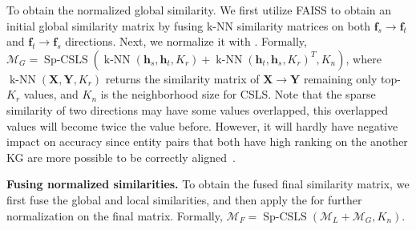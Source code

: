To obtain the normalized global similarity. We first utilize FAISS to obtain an initial global similarity matrix by fusing k-NN similarity matrices on both $\mathbf{f}_s \rightarrow \mathbf{f}_t$ and $\mathbf{f}_t \rightarrow \mathbf{f}_s$ directions. Next, we normalize it with \SparseCSLS{}. Formally, $\mathcal{M}_{G} = \operatorname{Sp-CSLS}(\operatorname{k-NN}(\mathbf{h}_s, \mathbf{h}_t,K_r) + \operatorname{k-NN}(\mathbf{h}_t, \mathbf{h}_s,K_r)^T, K_n)$, where $\operatorname{k-NN}(\mathbf{X}, \mathbf{Y},K_r)$ returns the similarity matrix of $\mathbf{X} \rightarrow \mathbf{Y}$ remaining only top-$K_r$ values, and $K_n$ is the neighborhood size for CSLS. Note that the sparse similarity of two directions may have some values overlapped, this overlapped values will become twice the value before. However, it will hardly have negative impact on accuracy since entity pairs that both have high ranking on the another KG are more possible to be correctly aligned~\cite{MRAEA20}.

\noindent
\textbf{Fusing normalized similarities.}
To obtain the fused final similarity matrix, we first fuse the global and local similarities, and then apply the \SparseCSLS{} for further normalization on the final matrix. Formally, $\mathcal{M}_{F}=\operatorname{Sp-CSLS}( \mathcal{M}_L +\mathcal{M}_G, K_n)$.







